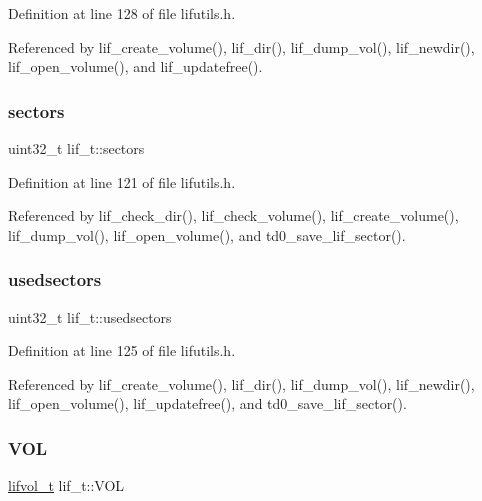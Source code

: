 Definition at line 128 of file lifutils.\+h.



Referenced by lif\+\_\+create\+\_\+volume(), lif\+\_\+dir(), lif\+\_\+dump\+\_\+vol(), lif\+\_\+newdir(), lif\+\_\+open\+\_\+volume(), and lif\+\_\+updatefree().

\mbox{\label{structlif__t_a262b14d8547abff49d9dd1b445faf6d5}} 
\subsubsection{\texorpdfstring{sectors}{sectors}}
{\footnotesize\ttfamily uint32\+\_\+t lif\+\_\+t\+::sectors}



Definition at line 121 of file lifutils.\+h.



Referenced by lif\+\_\+check\+\_\+dir(), lif\+\_\+check\+\_\+volume(), lif\+\_\+create\+\_\+volume(), lif\+\_\+dump\+\_\+vol(), lif\+\_\+open\+\_\+volume(), and td0\+\_\+save\+\_\+lif\+\_\+sector().

\mbox{\label{structlif__t_ad81767a2f65b997d5abecba130b89814}} 
\subsubsection{\texorpdfstring{usedsectors}{usedsectors}}
{\footnotesize\ttfamily uint32\+\_\+t lif\+\_\+t\+::usedsectors}



Definition at line 125 of file lifutils.\+h.



Referenced by lif\+\_\+create\+\_\+volume(), lif\+\_\+dir(), lif\+\_\+dump\+\_\+vol(), lif\+\_\+newdir(), lif\+\_\+open\+\_\+volume(), lif\+\_\+updatefree(), and td0\+\_\+save\+\_\+lif\+\_\+sector().

\mbox{\label{structlif__t_ae68126d2b9261ef9a6903a95d5c82cac}} 
\subsubsection{\texorpdfstring{V\+OL}{VOL}}
{\footnotesize\ttfamily \hyperlink{structlifvol__t}{lifvol\+\_\+t} lif\+\_\+t\+::\+V\+OL}



